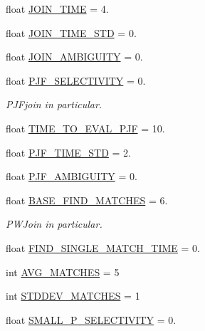 \begin{DoxyCompactItemize}
float \mbox{\hyperlink{namespacedynamicfilterapp_1_1toggles_aa58cd9d1d38e3a163d25193a2b16e365}{J\+O\+I\+N\+\_\+\+T\+I\+ME}} = 4.
\item 
float \mbox{\hyperlink{namespacedynamicfilterapp_1_1toggles_ae502c14d9af3013e7d53270e7d917ddf}{J\+O\+I\+N\+\_\+\+T\+I\+M\+E\+\_\+\+S\+TD}} = 0.
\item 
float \mbox{\hyperlink{namespacedynamicfilterapp_1_1toggles_acc5592b401b58ab4d282529788151e50}{J\+O\+I\+N\+\_\+\+A\+M\+B\+I\+G\+U\+I\+TY}} = 0.
\item 
float \mbox{\hyperlink{namespacedynamicfilterapp_1_1toggles_a1ca6fabc3122c8c7fa3e79743d8b1284}{P\+J\+F\+\_\+\+S\+E\+L\+E\+C\+T\+I\+V\+I\+TY}} = 0.
\begin{DoxyCompactList}\small\item\em P\+J\+Fjoin in particular. \end{DoxyCompactList}\item 
float \mbox{\hyperlink{namespacedynamicfilterapp_1_1toggles_aaa6b9c0193fd0df4a455732260a25296}{T\+I\+M\+E\+\_\+\+T\+O\+\_\+\+E\+V\+A\+L\+\_\+\+P\+JF}} = 10.
\item 
float \mbox{\hyperlink{namespacedynamicfilterapp_1_1toggles_aad16c427ff3264dff2ae020880e37fcf}{P\+J\+F\+\_\+\+T\+I\+M\+E\+\_\+\+S\+TD}} = 2.
\item 
float \mbox{\hyperlink{namespacedynamicfilterapp_1_1toggles_ac26d44f0e7f72ea9c97da03213497593}{P\+J\+F\+\_\+\+A\+M\+B\+I\+G\+U\+I\+TY}} = 0.
\item 
float \mbox{\hyperlink{namespacedynamicfilterapp_1_1toggles_a94a5d45581d82aff264727a66e113b1c}{B\+A\+S\+E\+\_\+\+F\+I\+N\+D\+\_\+\+M\+A\+T\+C\+H\+ES}} = 6.
\begin{DoxyCompactList}\small\item\em P\+W\+Join in particular. \end{DoxyCompactList}\item 
float \mbox{\hyperlink{namespacedynamicfilterapp_1_1toggles_ac7deeef7c5d246e8b7ad68bb3303369a}{F\+I\+N\+D\+\_\+\+S\+I\+N\+G\+L\+E\+\_\+\+M\+A\+T\+C\+H\+\_\+\+T\+I\+ME}} = 0.
\item 
int \mbox{\hyperlink{namespacedynamicfilterapp_1_1toggles_ab0b97a3743ae942843018e2b8ef2774c}{A\+V\+G\+\_\+\+M\+A\+T\+C\+H\+ES}} = 5
\item 
int \mbox{\hyperlink{namespacedynamicfilterapp_1_1toggles_ad6320ebb63e96c487bc89658c619eaf2}{S\+T\+D\+D\+E\+V\+\_\+\+M\+A\+T\+C\+H\+ES}} = 1
\item 
float \mbox{\hyperlink{namespacedynamicfilterapp_1_1toggles_a2ed0ddc00a45fccab5453503c7bd8152}{S\+M\+A\+L\+L\+\_\+\+P\+\_\+\+S\+E\+L\+E\+C\+T\+I\+V\+I\+TY}} = 0.

\end{DoxyCompactItemize}

